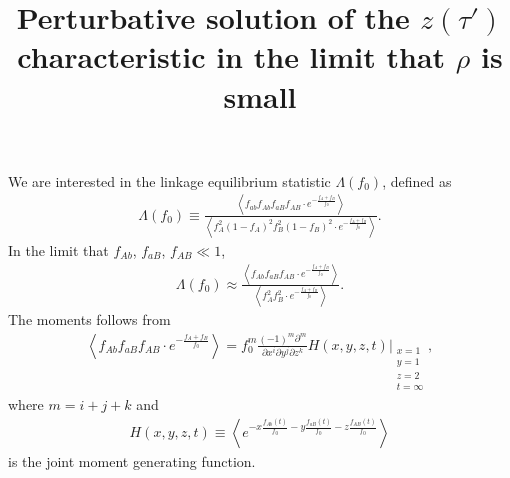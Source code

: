 \documentclass[11pt]{article}
\title{\vspace{-36 pt} \Large Perturbative solution of the $z(\tau')$ characteristic in the limit that $\rho$ is small \vspace{-36 pt}}
\date{}
\begin{document}
We are interested in the linkage equilibrium statistic $\Lambda(f_0)$, defined as
\begin{align}
    \Lambda(f_0) \equiv \frac{\left\langle f_{ab}f_{Ab}f_{aB}f_{AB} \cdot e^{-\frac{f_{A}+f_{B}}{f_0}}\right\rangle}{\left\langle f_A^2(1-f_A)^2f_B^2(1-f_B)^2\cdot e^{-\frac{f_{A}+f_{B}}{f_0}}\right\rangle}.
\end{align}
In the limit that $f_{Ab}$, $f_{aB}$, $f_{AB} \ll1$, 
\begin{align}\label{eq:lambda_small_f}
    \Lambda(f_0) \approx \frac{\left\langle f_{Ab}f_{aB}f_{AB} \cdot e^{-\frac{f_{A}+f_{B}}{f_0}}\right\rangle}{\left\langle f_A^2f_B^2\cdot e^{-\frac{f_{A}+f_{B}}{f_0}}\right\rangle}.
\end{align}
The moments follows from 
\begin{align}\label{eq:lambda_numerator}
    \left\langle f_{Ab}f_{aB}f_{AB}\cdot e^{-\frac{f_{A}+f_{B}}{f_0}}\right\rangle
    = f_0^{m} \frac{(-1)^{m}\partial^{m}}{\partial x^i \partial y^j \partial z^k} H(x, y, z, t) \Bigg\vert_{\substack{x=1 \\ y=1 \\ z=2 \\ t=\infty}},
\end{align}
where $m = i+j+k$ and 
\begin{align}
    H(x, y, z, t) \equiv \left\langle e^{-x\frac{f_{Ab}(t)}{f_0}-y\frac{f_{aB}(t)}{f_0}-z\frac{f_{AB}(t)}{f_0}} \right\rangle 
\end{align}
is the joint moment generating function. 
\end{document}
